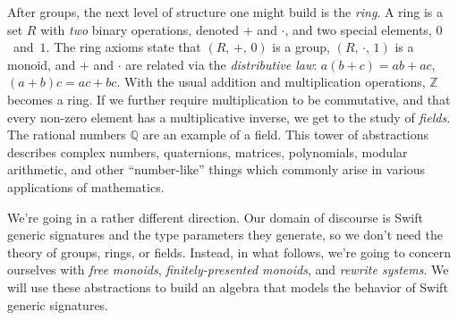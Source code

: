 \documentclass[../generics]{subfiles}
\begin{document}
After groups, the next level of structure one might build is the \emph{ring}. A ring is a set $R$ with \emph{two} binary operations, denoted $+$ and $\cdot$, and two special elements, $0$~and~$1$. The ring axioms state that $(R,\,+,\,0)$ is a group, $(R,\,\cdot,\,1)$ is a monoid, and $+$ and $\cdot$ are related via the \emph{distributive law}: $a(b+c)=ab+ac$, $(a+b)c=ac+bc$. With the usual addition and multiplication operations, $\mathbb{Z}$ becomes a ring. If we further require multiplication to be commutative, and that every non-zero element has a multiplicative inverse, we get to the study of \emph{fields}. The rational numbers $\mathbb{Q}$ are an example of a field. This tower of abstractions describes complex numbers, quaternions, matrices, polynomials, modular arithmetic, and other ``number-like'' things which commonly arise in various applications of mathematics.

We're going in a rather different direction. Our domain of discourse is Swift generic signatures and the type parameters they generate, so we don't need the theory of groups, rings, or fields. Instead, in what follows, we're going to concern ourselves with \emph{free monoids}, \emph{finitely-presented monoids}, and \emph{rewrite systems}. We will use these abstractions to build an algebra that models the behavior of Swift generic signatures.
\end{document}
